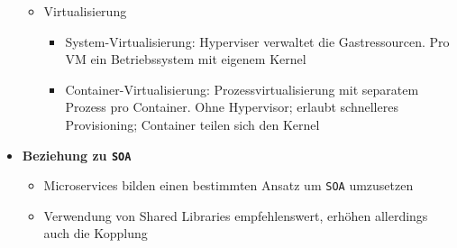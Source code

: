 \begin{itemize}
\begin{itemize}
\begin{itemize}
		\end{itemize}
		\item Virtualisierung
		\begin{itemize}
			\item System-Virtualisierung: Hyperviser verwaltet die Gastressourcen. Pro VM ein Betriebssystem mit eigenem Kernel
			\item Container-Virtualisierung: Prozessvirtualisierung mit separatem Prozess pro Container. Ohne Hypervisor; erlaubt schnelleres Provisioning; Container teilen sich den Kernel
		\end{itemize}
	\end{itemize}
	\item \textbf{Beziehung zu \texttt{SOA}}
	\begin{itemize}
		\item Microservices bilden einen bestimmten Ansatz um \texttt{SOA} umzusetzen
		\item Verwendung von Shared Libraries empfehlenswert, erhöhen allerdings auch die Kopplung
	\end{itemize}
\end{itemize}


